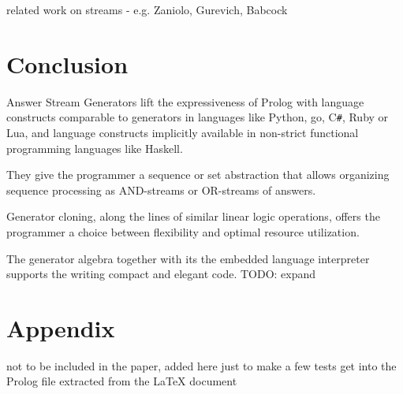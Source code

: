 \documentclass{new_tlp}
\begin{document}
{\Large related work on streams - e.g. Zaniolo, Gurevich,  Babcock}

\section{Conclusion}

Answer Stream Generators lift the expressiveness of Prolog with language constructs comparable to generators in languages like Python, go, C\verb~#~, Ruby or Lua, and language constructs implicitly available in non-strict functional programming languages like Haskell. 

They give the programmer a sequence or set abstraction that allows organizing sequence processing as AND-streams or OR-streams of answers.

Generator cloning, along the lines of similar linear logic operations, 
offers the programmer a choice between flexibility and optimal resource utilization.

The generator algebra together with its the embedded language interpreter supports
the writing compact and elegant code.
{TODO: expand}





\section*{Appendix}

{\large not to be included in the paper, added here just to make a few tests get into the Prolog file extracted from the LaTeX document}
\end{document}
